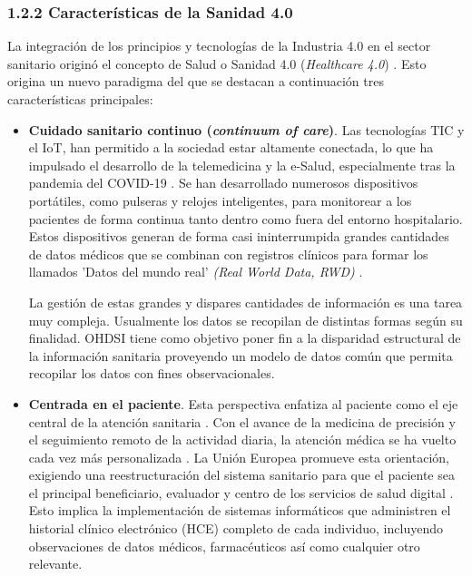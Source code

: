\subsubsection{1.2.2 Características de la Sanidad 4.0}

La integración de los principios y tecnologías de la Industria 4.0 en el sector sanitario originó el concepto de Salud o Sanidad 4.0 (\textit{Healthcare 4.0}) \parencite{tortorella2020healthcare, tortorella2021impacts}. 
Esto origina un nuevo paradigma del que se destacan a continuación tres características principales: %

\begin{itemize}

\item \textbf{Cuidado sanitario continuo (\textit{continuum of care})}. Las tecnologías TIC y el IoT, han permitido a la sociedad estar altamente conectada, lo que ha impulsado el desarrollo de la telemedicina y la e-Salud, especialmente tras la pandemia del COVID-19 \parencite{martin2021ehealth}. Se han desarrollado numerosos dispositivos portátiles, como pulseras y relojes inteligentes, para monitorear a los pacientes de forma continua tanto dentro como fuera del entorno hospitalario. Estos dispositivos generan de forma casi ininterrumpida grandes cantidades de datos médicos que se combinan con registros clínicos para formar los llamados 'Datos del mundo real' \textit{(Real World Data, RWD)} \parencite{kouroubali2019new}. 

La gestión de estas grandes y dispares cantidades de información es una tarea muy compleja. Usualmente los datos se recopilan de distintas formas según su finalidad. OHDSI tiene como objetivo poner fin a la disparidad estructural de la información sanitaria proveyendo un modelo de datos común que permita recopilar los datos con fines observacionales.

\item \textbf{Centrada en el paciente}. Esta perspectiva enfatiza al paciente como el eje central de la atención sanitaria \parencite{tortorella2020healthcare}. Con el avance de la medicina de precisión y el seguimiento remoto de la actividad diaria, la atención médica se ha vuelto cada vez más personalizada \parencite{ruiz2023inteligencia}. La Unión Europea promueve esta orientación, exigiendo una reestructuración del sistema sanitario para que el paciente sea el principal beneficiario, evaluador y centro de los servicios de salud digital \parencite{ntafi2022legal, katehakis2019framework}. Esto implica la implementación de sistemas informáticos que administren el historial clínico electrónico (HCE) completo de cada individuo, incluyendo observaciones de datos médicos, farmacéuticos así como cualquier otro relevante.


\end{itemize}

